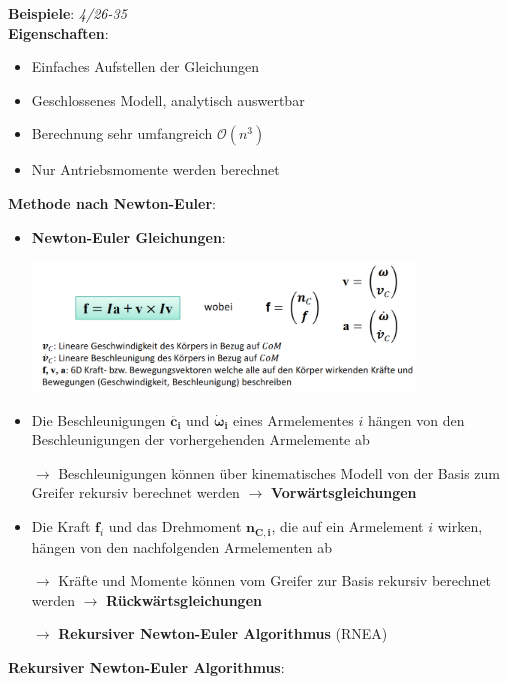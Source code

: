 \textbf{Beispiele}: \textit{4/26-35}\\

\textbf{Eigenschaften}:
\begin{itemize}
	\item Einfaches Aufstellen der Gleichungen
	\item Geschlossenes Modell, analytisch auswertbar
	\item Berechnung sehr umfangreich $\mathcal{O}(n^3)$
	\item Nur Antriebsmomente werden berechnet
\end{itemize}
\bigskip
\textbf{Methode nach Newton-Euler}:
\begin{itemize}
	\item \textbf{Newton-Euler Gleichungen}: 
	\begin{center}
		\includegraphics[width=0.8\textwidth]{images/newton-euler.png}
	\end{center}
	\item Die Beschleunigungen $\mathbf{\ddot{c_i}}$ und $\boldsymbol{\dot{\omega}_i}$ eines Armelementes $i$ hängen von den Beschleunigungen der vorhergehenden Armelemente ab
	
	$\rightarrow$ Beschleunigungen können über kinematisches Modell von der Basis zum Greifer rekursiv	berechnet werden $\rightarrow$ \textbf{Vorwärtsgleichungen}
	
	\item Die Kraft $\mathbf{f}_i$ und das Drehmoment $\mathbf{n_{C,i}}$, die auf ein Armelement $i$ wirken, hängen von den nachfolgenden Armelementen ab
	
	$\rightarrow$ Kräfte und Momente können vom Greifer zur Basis rekursiv berechnet werden
	$\rightarrow$ \textbf{Rückwärtsgleichungen}
	
	$\rightarrow$ \textbf{Rekursiver Newton-Euler Algorithmus} (RNEA)
\end{itemize}
\bigskip
\textbf{Rekursiver Newton-Euler Algorithmus}:
